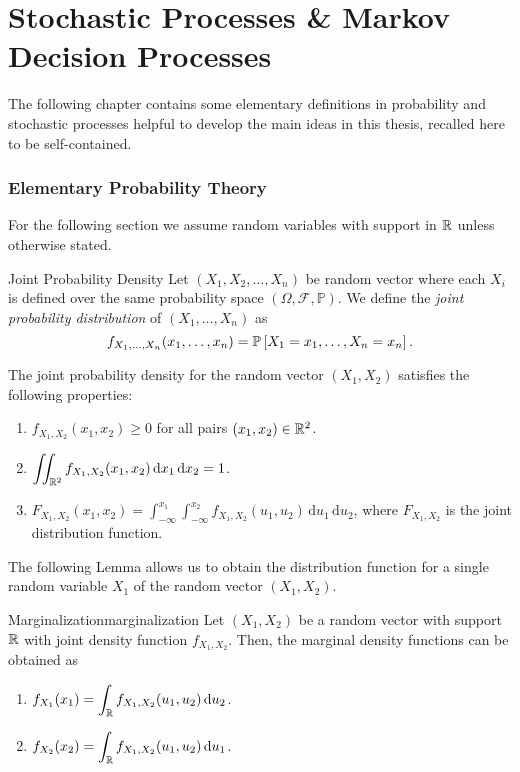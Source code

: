 \chapter{Stochastic Processes \& Markov Decision Processes}
\label{appendix:Stochastic}

The following chapter contains some elementary definitions in probability and
stochastic processes helpful to develop the main ideas in this thesis, recalled
here to be self-contained.

\subsection{Elementary Probability Theory}

For the following section we assume random variables with support in $\mathbb{R}$ unless
otherwise stated.

\begin{dfn}{Joint Probability Density}{}
    Let $(X_1, X_2, \dots, X_n)$ be random vector where each $X_i$ is defined
    over the same probability space $(\Omega, \mathcal{F}, \mathbb{P})$. We
    define the \emph{joint probability distribution} of $(X_1, \dots, X_n)$ as
    \[
        f_{X_1, \dots, X_n} (x_1, \dots, x_n) = \mathbb{P}\left[X_1 = x_1, \dots, X_n = x_n\right].    
    \] 
\end{dfn}

The joint probability density for the random vector $(X_1, X_2)$ satisfies
the following properties:
\begin{enumerate}
    \item $f_{X_1, X_2} (x_1, x_2) \geq 0$ for all pairs $(x_1, x_2) \in \mathbb{R}^{2}$.
    \item $\displaystyle \iint_{\mathbb{R}^{2}} f_{X_1, X_2} (x_1, x_2) \, \mathrm{d} x_1 \, \mathrm{d} x_2 = 1$.
    \item $F_{X_1, X_2} (x_1, x_2) = \int_{-\infty}^{x_1} \int_{-\infty}^{x_2}
        f_{X_1, X_2} (u_1, u_2) \, \mathrm{d} u_1 \, \mathrm{d} u_2$, where
        $F_{X_1, X_2}$ is the joint distribution function.
\end{enumerate}

The following Lemma allows us to obtain the distribution function for a single
random variable $X_1$ of the random vector $(X_1, X_2)$.

\begin{lemma}{Marginalization}{marginalization}
    Let $(X_1, X_2)$ be a random vector with support $\mathbb{R}$ with joint density
    function $f_{X_1, X_2}$. Then, the marginal density functions can be
    obtained as
    \begin{enumerate}
        \item $\displaystyle f_{X_1} (x_1) = \int_{\mathbb{R}} f_{X_1, X_2} (u_1, u_2) \, \mathrm{d} u_2$.
        \item $\displaystyle f_{X_2} (x_2) = \int_{\mathbb{R}} f_{X_1, X_2} (u_1, u_2) \, \mathrm{d} u_1$.
    \end{enumerate}
\end{lemma}

